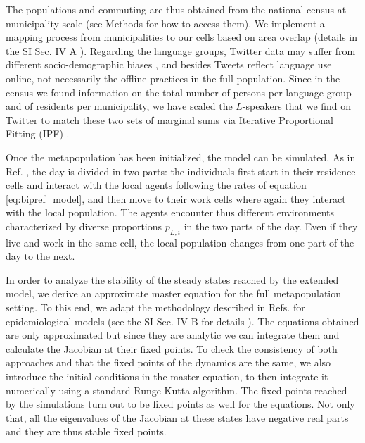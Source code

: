 \documentclass[../thesis.tex]{subfiles}
\begin{document}
The populations and commuting are thus obtained from the national census at municipality
scale (see Methods for how to access them). We implement a mapping process from
municipalities to our cells based on area overlap (details in the SI Sec. IV A
\cite{supp}). Regarding the language groups, Twitter data may suffer from different
socio-demographic biases
\cite{MisloveUnderstandingDemographics2011,NguyenAudienceUse2015}, and besides Tweets
reflect language use online, not necessarily the offline practices in the full
population. Since in the census we found information on the total number of persons per
language group and of residents per municipality, we have scaled the $L$-speakers that
we find on Twitter to match these two sets of marginal sums via Iterative Proportional
Fitting (IPF) \cite{DemingLeastSquares1940,FienbergIterativeProcedure1970}.

Once the metapopulation has been initialized, the model can be simulated. As in Ref.
\cite{Fernandez-GraciaVoterModel2014}, the day is divided in two parts: the individuals
first start in their residence cells and interact with the local agents following the
rates of equation \eqref{eq:bipref_model}, and then move to their work cells where again
they interact with the local population. The agents encounter thus different
environments characterized by diverse proportions $p_{L,i}$ in the two parts of the day.
Even if they live and work in the same cell, the local population changes from one part
of the day to the next.

In order to analyze the stability of the steady states reached by the extended model, we
derive an approximate master equation for the full metapopulation setting. To this end,
we adapt the methodology described in Refs.
\cite{SattenspielStructuredEpidemic1995,BalcanModelingSpatial2010} for epidemiological
models (see the SI Sec. IV B for details \cite{supp}). The equations obtained are only
approximated but since they are analytic we can integrate them and calculate the
Jacobian at their fixed points. To check the consistency of both approaches and that the
fixed points of the dynamics are the same, we also introduce the initial conditions in
the master equation, to then integrate it numerically using a standard Runge-Kutta
algorithm. The fixed points reached by the simulations turn out to be fixed points as
well for the equations. Not only that, all the eigenvalues of the Jacobian at these
states have negative real parts and they are thus stable fixed points.
\end{document}
